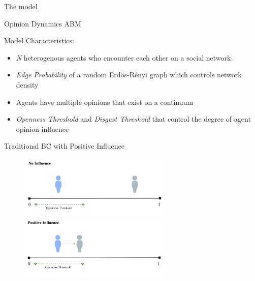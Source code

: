 \documentclass[12pt]{beamer}
\begin{document}
\begin{frame}[c]{The model}  %




\large

\centering
Opinion Dynamics ABM

\vspace{.05in}
Model Characteristics:
\vspace{-.15in}

\small
\begin{itemize}
\itemsep.1em
\item \textit{N} heterogenous agents who encounter each other on a social network.
\item \textit{Edge Probability} of a random Erd\"{o}s-R\'{e}nyi graph which controls network density
\item Agents have multiple opinions that exist on a continuum
\item \textit{Openness Threshold} and \textit{Disgust Threshold} that control the degree of agent opinion influence
\end{itemize}


\end{frame}


\begin{frame}[c]{Traditional BC with Positive Influence}  %


\begin{figure}
	\includegraphics[width=0.65\textwidth]{images/BCNoInfluence.png}
	\hfill
	\includegraphics[width=0.65\textwidth]{images/BCPositiveInfluence.png}
\end{figure}


\end{frame}
\end{document}
